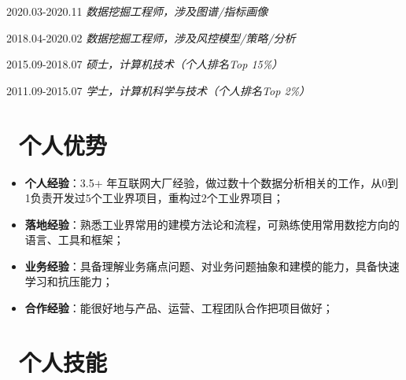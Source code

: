 \documentclass{resume}
\begin{document}
                                  {2020.03-2020.11}
   \faUserMd   \textit{   数据挖掘工程师，涉及图谱/指标画像 }

                                 {2018.04-2020.02}
   \faUserMd   \textit{   数据挖掘工程师，涉及风控模型/策略/分析 }

                                              {2015.09-2018.07}
   \faGraduationCap   \textit{  硕士，计算机技术（个人排名Top 15\%） }

                                  {2011.09-2015.07}
   \faGraduationCap   \textit{  学士，计算机科学与技术（个人排名Top 2\%）}

\medskip










\section{   \faFlag    \  个人优势}

\begin{itemize}  [parsep=0.8ex]
   \item  \textbf{个人经验}：3.5+ 年互联网大厂经验，做过数十个数据分析相关的工作，从0到1负责开发过5个工业界项目，重构过2个工业界项目；

   \item   \textbf{落地经验}：熟悉工业界常用的建模方法论和流程，可熟练使用常用数挖方向的语言、工具和框架；
   
   \item  \textbf{业务经验}：具备理解业务痛点问题、对业务问题抽象和建模的能力，具备快速学习和抗压能力；
  
  \item \textbf{合作经验}：能很好地与产品、运营、工程团队合作把项目做好；
 
\end{itemize}

\medskip










\section{   \faCogs    \  个人技能}
\end{document}
